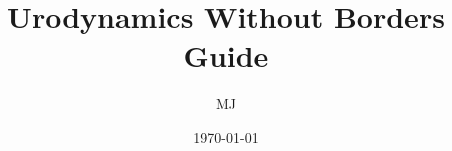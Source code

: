 \documentclass{article}
\begin{document}
\title{Urodynamics Without Borders Guide}
\author{MJ}
\date{\today}
\maketitle

\clearpage

\tableofcontents

\clearpage


\end{document}
